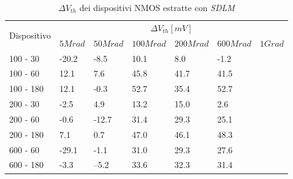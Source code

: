 \documentclass[12pt, letterpaper]{book}
\begin{document}
\begin{table}[H]
  \renewcommand{\arraystretch}{1.3}
  \begin{tabular}{m{2cm}  m{1.1cm} m{1.3cm} m{1.5cm} m{1.5cm} m{1.5cm} m{1cm}}
    \toprule
    \multirow{2}{*}{Dispositivo} & \multicolumn{6}{c}{$\Delta V_{th} [mV] $}                                                          \\
    \cmidrule{2-7}
                                 & $5Mrad$                            & $50Mrad$ & $100Mrad$ & $200Mrad$ & $600Mrad$ & $1Grad$ \\
    \midrule
    100 - 30                     & -20.2                              & -8.5     & 10.1      & 8.0       & -1.2      &         \\
    \hline
    100 - 60                     & 12.1                               & 7.6      & 45.8      & 41.7      & 41.5      &         \\
    \hline
    100 - 180                     & 12.1                               & -0.3     & 52.7      & 35.4      & 52.7      &         \\
    \hline
    200 - 30                     & -2.5                               & 4.9      & 13.2      & 15.0      & 2.6       &         \\
    \hline
    200 - 60                    & -0.6                               & -12.7    & 31.4      & 29.3      & 25.1      &         \\
    \hline
    200 - 180                     & 7.1                                & 0.7      & 47.0      & 46.1      & 48.3      &         \\
    \hline
    600 - 60                     & -29.1                              & -1.1     & 31.0      & 29.3      & 27.6      &         \\
    \hline
    600 - 180                    & -3.3                               & --5.2    & 33.6      & 32.3      & 31.4      &         \\
    \bottomrule
  \end{tabular}
  \caption{$\Delta V_{th}$ dei dispositivi NMOS estratte con \emph{SDLM}}
  \label{tab:deltaVthSDLMN}
\end{table}
\end{document}

